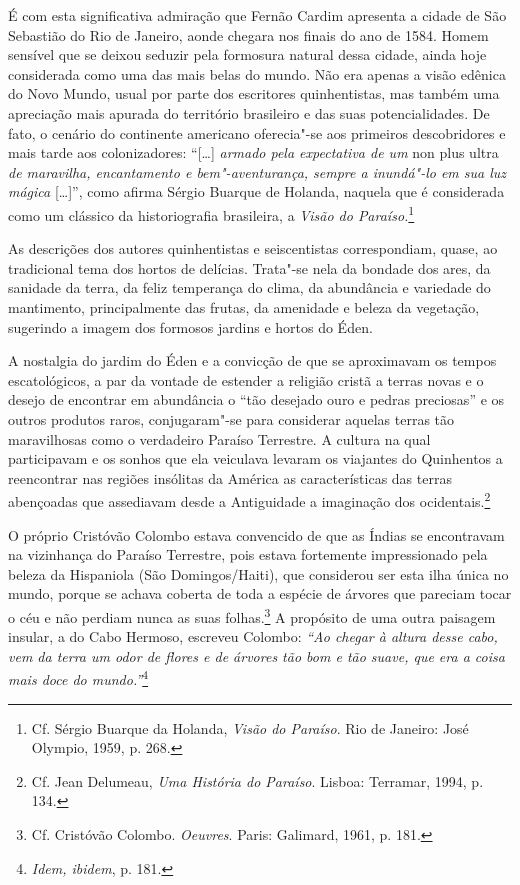 É com esta significativa admiração que Fernão Cardim
apresenta a cidade de São Sebastião do Rio de Janeiro, aonde chegara nos
finais do ano de 1584. Homem sensível que se deixou seduzir pela
formosura natural dessa cidade, ainda hoje considerada como uma das
mais belas do mundo. Não era apenas a visão edênica do Novo Mundo,
usual por parte dos escritores quinhentistas, mas também uma
apreciação mais apurada do território brasileiro e das suas
potencialidades. De fato, o cenário do continente americano
oferecia"-se aos primeiros descobridores e mais tarde aos
colonizadores: ``[\ldots{}] \textit{armado pela expectativa de um} non plus ultra \textit{de maravilha, 
encantamento e bem"-aventurança, sempre a inundá"-lo em sua luz mágica} [\ldots{}]'',
como afirma Sérgio Buarque de Holanda, naquela que
é considerada como um clássico da historiografia brasileira, a
\textit{Visão do Paraíso.}\footnote{ Cf. Sérgio Buarque da Holanda,
\textit{Visão do Paraíso}. Rio de Janeiro: José Olympio, 1959, p. 268.}

As descrições dos autores quinhentistas e seiscentistas
correspondiam, quase, ao tradicional tema dos hortos de delícias.
Trata"-se nela da bondade dos ares, da sanidade da terra, da feliz
temperança do clima, da abundância e variedade do mantimento,
principalmente das frutas, da amenidade e beleza da vegetação,
sugerindo a imagem dos formosos jardins e hortos do Éden.

A nostalgia do jardim do Éden e a convicção de que se aproximavam os
tempos escatológicos, a par da vontade de estender a religião cristã a
terras novas e o desejo de encontrar em abundância o ``tão desejado
ouro e pedras preciosas'' e os outros produtos raros, conjugaram"-se
para considerar aquelas terras tão maravilhosas como o verdadeiro
Paraíso Terrestre. A cultura na qual participavam e os sonhos que ela
veiculava levaram os viajantes do Quinhentos a reencontrar nas regiões
insólitas da América as características das terras abençoadas que
assediavam desde a Antiguidade a imaginação dos ocidentais.\footnote{ Cf. Jean Delumeau, 
\textit{Uma História do Paraíso}. Lisboa: Terramar, 1994, p. 134.} 

 O próprio Cristóvão Colombo estava convencido de que as 
Índias se encontravam na vizinhança do Paraíso Terrestre, pois estava
fortemente impressionado pela beleza da Hispaniola (São
Domingos/Haiti), que considerou ser esta ilha única no mundo, porque se
achava coberta de toda a espécie de árvores que pareciam tocar o céu e
não perdiam nunca as suas folhas.\footnote{ Cf. Cristóvão
Colombo. \textit{Oeuvres}. Paris: Galimard, 1961, p. 181.} A
propósito de uma outra paisagem insular, a do Cabo Hermoso, escreveu
Colombo: \textit{``Ao chegar à altura desse cabo, vem da terra um
odor de flores e de árvores tão bom e tão suave, que era a coisa mais
doce do mundo.''}\footnote{ \textit{Idem, ibidem}, p. 181.} 

